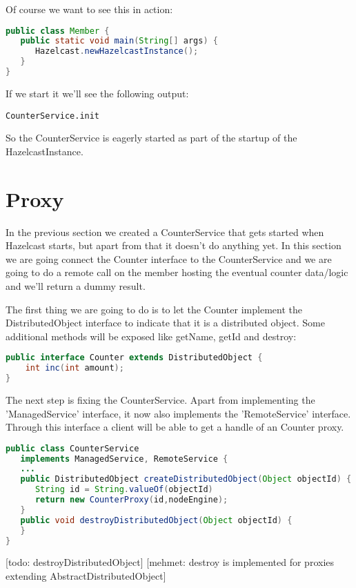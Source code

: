 Of course we want to see this in action:
\begin{lstlisting}[language=java]
public class Member {
   public static void main(String[] args) {
      Hazelcast.newHazelcastInstance();
   }
}
\end{lstlisting}
If we start it we'll see the following output:
\begin{lstlisting}
CounterService.init
\end{lstlisting}
So the CounterService is eagerly started as part of the startup of the HazelcastInstance.

\section{Proxy}
In the previous section we created a CounterService that gets started when Hazelcast starts, but apart from that it doesn't do anything yet. In this section we are going connect the Counter interface to the CounterService and we are going to do a remote call on the member hosting the eventual counter data/logic and we'll return a dummy result.

The first thing we are going to do is to let the Counter implement the DistributedObject interface to indicate that it is a distributed object. Some additional methods will be exposed like getName, getId and destroy:
\begin{lstlisting}[language=java]
public interface Counter extends DistributedObject {
    int inc(int amount);
}
\end{lstlisting}

The next step is fixing the CounterService. Apart from implementing the 'ManagedService' interface, it now also implements the 'RemoteService' interface. Through this interface a client will be able to get a handle of an Counter proxy. 
\begin{lstlisting}[language=java]
public class CounterService 
   implements ManagedService, RemoteService {
   ...  
   public DistributedObject createDistributedObject(Object objectId) {
      String id = String.valueOf(objectId)
      return new CounterProxy(id,nodeEngine);
   }
   public void destroyDistributedObject(Object objectId) {
   }
}
\end{lstlisting}
[todo: destroyDistributedObject] [mehmet: destroy is implemented for proxies extending AbstractDistributedObject]

